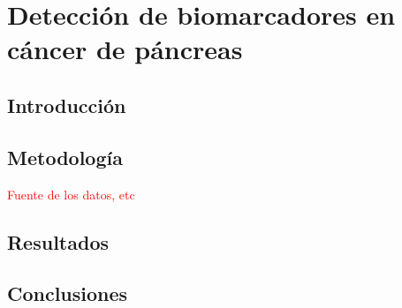 \chapter{Detección de biomarcadores en cáncer de páncreas}

\section{Introducción}

\section{Metodología}

\textcolor{red}{Fuente de los datos, etc}

\section{Resultados}


\section{Conclusiones}

